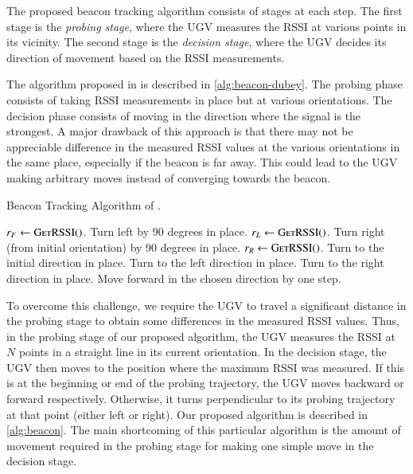 \documentclass[conference]{IEEEtran}
\begin{document}
The proposed beacon tracking algorithm consists of stages at each step. The
first stage is the \emph{probing stage}, where the UGV measures the RSSI at
various points in its vicinity. The second stage is the \emph{decision stage},
where the UGV decides its direction of movement based on the RSSI measurements.

The algorithm proposed in \cite{dubeyNavigationCommunicationUGV2022} is
described in \autoref{alg:beacon-dubey}. The probing phase consists of taking
RSSI measurements in place but at various orientations. The decision phase
consists of moving in the direction where the signal is the strongest. A major
drawback of this approach is that there may not be appreciable difference in the
measured RSSI values at the various orientations in the same place, especially
if the beacon is far away. This could lead to the UGV making arbitrary moves
instead of converging towards the beacon.

\begin{algorithm}[H]
    \caption{Beacon Tracking Algorithm of \cite{dubeyNavigationCommunicationUGV2022}.}
    \label{alg:beacon-dubey}
    \begin{algorithmic}[1]
            \State \(r_F \gets \textsc{GetRSSI()}\).
            \State Turn left by 90 degrees in place.
            \State \(r_L \gets \textsc{GetRSSI()}\).
            \State Turn right (from initial orientation) by 90 degrees in place.
            \State \(r_R \gets \textsc{GetRSSI()}\).
                \State Turn to the initial direction in place.
                \State Turn to the left direction in place.
                \State Turn to the right direction in place.
            \EndIf
            \State Move forward in the chosen direction by one step.
        \EndWhile
    \end{algorithmic}
\end{algorithm}

To overcome this challenge, we require the UGV to travel a significant distance
in the probing stage to obtain some differences in the measured RSSI values.
Thus, in the probing stage of our proposed algorithm, the UGV measures the RSSI
at \(N\) points in a straight line in its current orientation. In the decision
stage, the UGV then moves to the position where the maximum RSSI was measured.
If this is at the beginning or end of the probing trajectory, the UGV moves
backward or forward respectively. Otherwise, it turns perpendicular to its
probing trajectory at that point (either left or right). Our proposed algorithm
is described in \autoref{alg:beacon}. The main shortcoming of this particular
algorithm is the amount of movement required in the probing stage for making one
simple move in the decision stage.
\end{document}
